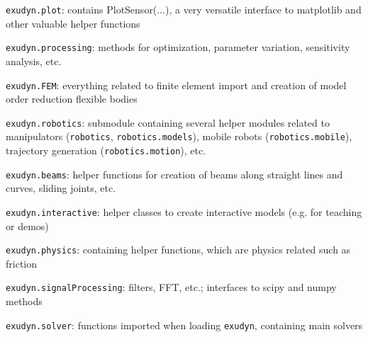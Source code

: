     \item[--] \texttt{exudyn.plot}: contains PlotSensor(...), a very versatile interface to matplotlib and other valuable helper functions
    \item[--] \texttt{exudyn.processing}: methods for optimization, parameter variation, sensitivity analysis, etc.
    \item[--] \texttt{exudyn.FEM}: everything related to finite element import and creation of model order reduction flexible bodies
    \item[--] \texttt{exudyn.robotics}: submodule containing several helper modules related to manipulators (\texttt{robotics}, \texttt{robotics.models}), mobile robots (\texttt{robotics.mobile}), trajectory generation (\texttt{robotics.motion}), etc.
    \item[--] \texttt{exudyn.beams}: helper functions for creation of beams along straight lines and curves, sliding joints, etc.
    \item[--] \texttt{exudyn.interactive}: helper classes to create interactive models (e.g. for teaching or demos)
    \item[--] \texttt{exudyn.physics}: containing helper functions, which are physics related such as friction
    \item[--] \texttt{exudyn.signalProcessing}: filters, FFT, etc.; interfaces to scipy and numpy methods
    \item[--] \texttt{exudyn.solver}: functions imported when loading \texttt{exudyn}, containing main solvers
  \ei
\ei
%
